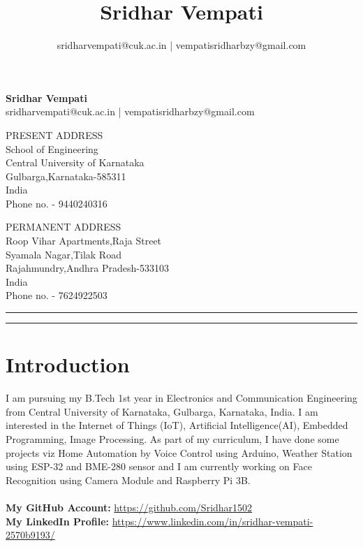 \documentclass[]{article}
\title{Sridhar Vempati}
\author{sridharvempati@cuk.ac.in | vempatisridharbzy@gmail.com}
\begin{document}
    \begin{center}
        \Huge \textbf{Sridhar Vempati}\\
        \large sridharvempati@cuk.ac.in | vempatisridharbzy@gmail.com\\ 
    \end{center}
    \begin{multicols}{2}[]
        \begin{flushleft}
            PRESENT ADDRESS\\School of Engineering\\Central University of Karnataka\\Gulbarga,Karnataka-585311\\India\\Phone no. - 9440240316
        \end{flushleft}
        \begin{flushright}
            PERMANENT ADDRESS\\Roop Vihar Apartments,Raja Street\\Syamala Nagar,Tilak Road\\Rajahmundry,Andhra Pradesh-533103\\India\\Phone no. - 7624922503
        \end{flushright}
    \end{multicols}  
    \begin{spacing}{0.05} %
    \noindent
    \rule{\linewidth}{2pt}  
    \rule{\linewidth}{1pt}  
    \end{spacing}
    \section{Introduction}
    I am pursuing my B.Tech 1st year in Electronics and Communication Engineering from Central University of Karnataka, Gulbarga, Karnataka, India.
    I am interested in the Internet of Things (IoT), Artificial Intelligence(AI), Embedded Programming, Image Processing.
    As part of my curriculum, I have done some projects viz Home Automation by Voice Control using Arduino, Weather Station using ESP-32 and BME-280 sensor and I am currently working on Face Recognition using Camera Module and Raspberry Pi 3B.\\
    \\ \textbf{My GitHub Account:} \url{https://github.com/Sridhar1502}
    \\ \textbf{My LinkedIn Profile:} \url{https://www.linkedin.com/in/sridhar-vempati-2570b9193/}
\end{document}
